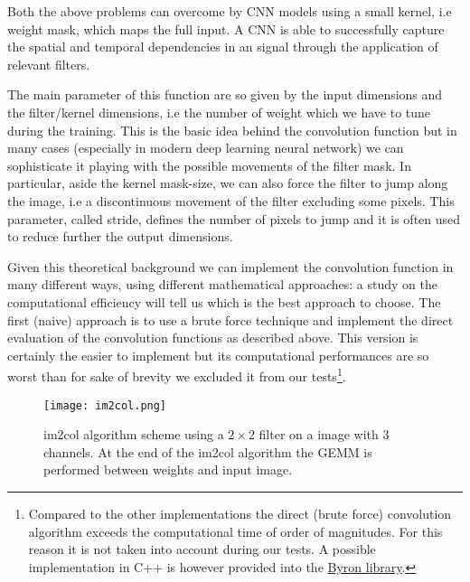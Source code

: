 \documentclass{standalone}
\begin{document}
Both the above problems can overcome by CNN models using a small kernel, i.e weight mask, which maps the full input.
A CNN is able to successfully capture the spatial and temporal dependencies in an signal through the application of relevant filters.

The main parameter of this function are so given by the input dimensions and the filter/kernel dimensions, i.e the number of weight which we have to tune during the training.
This is the basic idea behind the convolution function but in many cases (especially in modern deep learning neural network) we can sophisticate it playing with the possible movements of the filter mask.
In particular, aside the kernel mask-size, we can also force the filter to jump along the image, i.e a discontinuous movement of the filter excluding some pixels.
This parameter, called \textsf{stride}, defines the number of pixels to jump and it is often used to reduce further the output dimensions.

Given this theoretical background we can implement the convolution function in many different ways, using different mathematical approaches: a study on the computational efficiency will tell us which is the best approach to choose.
The first (naive) approach is to use a brute force technique and implement the direct evaluation of the convolution functions as described above.
This version is certainly the easier to implement but its computational performances are so worst than for sake of brevity we excluded it from our tests\footnote{
  Compared to the other implementations the direct (brute force) convolution algorithm exceeds the computational time of order of magnitudes.
  For this reason it is not taken into account during our tests.
  A possible implementation in C++ is however provided into the \href{https://github.com/Nico-Curti/Byron/blob/master/utility/winograd_test.cpp}{Byron library}.
}.


\begin{center}
\begin{figure}[htbp]
\centering
\texttt{[image: im2col.png]}
\caption{\textsf{im2col} algorithm scheme using a $2\times2$ filter on a image with 3 channels.
At the end of the \textsf{im2col} algorithm the GEMM is performed between weights and input image.
}
\label{fig:im2col}
\end{figure}
\end{center}
\end{document}
